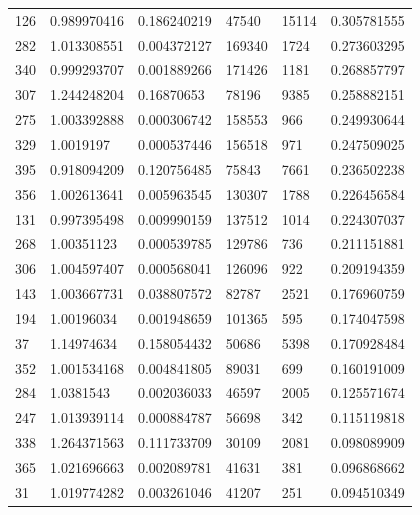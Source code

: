 \documentclass{cumcmthesis}
\begin{document}
\begin{description}
\begin{longtable}{l|llll|l}
            126  & 0.989970416  & 0.186240219  & 47540    & 15114          & 0.305781555    \\
            282  & 1.013308551  & 0.004372127  & 169340   & 1724           & 0.273603295    \\
            340  & 0.999293707  & 0.001889266  & 171426   & 1181           & 0.268857797    \\
            307  & 1.244248204  & 0.16870653   & 78196    & 9385           & 0.258882151    \\
            275  & 1.003392888  & 0.000306742  & 158553   & 966            & 0.249930644    \\
            329  & 1.0019197    & 0.000537446  & 156518   & 971            & 0.247509025    \\
            395  & 0.918094209  & 0.120756485  & 75843    & 7661           & 0.236502238    \\
            356  & 1.002613641  & 0.005963545  & 130307   & 1788           & 0.226456584    \\
            131  & 0.997395498  & 0.009990159  & 137512   & 1014           & 0.224307037    \\
            268  & 1.00351123   & 0.000539785  & 129786   & 736            & 0.211151881    \\
            306  & 1.004597407  & 0.000568041  & 126096   & 922            & 0.209194359    \\
            143  & 1.003667731  & 0.038807572  & 82787    & 2521           & 0.176960759    \\
            194  & 1.00196034   & 0.001948659  & 101365   & 595            & 0.174047598    \\
            37   & 1.14974634   & 0.158054432  & 50686    & 5398           & 0.170928484    \\
            352  & 1.001534168  & 0.004841805  & 89031    & 699            & 0.160191009    \\
            284  & 1.0381543    & 0.002036033  & 46597    & 2005           & 0.125571674    \\
            247  & 1.013939114  & 0.000884787  & 56698    & 342            & 0.115119818    \\
            338  & 1.264371563  & 0.111733709  & 30109    & 2081           & 0.098089909    \\
            365  & 1.021696663  & 0.002089781  & 41631    & 381            & 0.096868662    \\
            31   & 1.019774282  & 0.003261046  & 41207    & 251            & 0.094510349    \\

\end{longtable}
\end{description}
\end{document}
